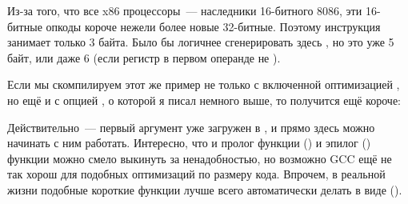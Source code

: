 Из-за того, что все x86 процессоры~--- наследники 16-битного 8086, эти  16-битные опкоды короче 
нежели более новые 32-битные. 
Поэтому инструкция  занимает только 3 байта. 
Было бы логичнее сгенерировать здесь , но это уже 5 байт, или даже 6 
(если регистр в первом операнде не \EAX).


Если мы скомпилируем этот же пример не только с включенной оптимизацией \Othree, 
но ещё и с опцией , о которой я писал немного выше, то получится ещё короче:



Действительно~--- первый аргумент уже загружен в \EAX, и прямо здесь можно начинать с ним работать. 
Интересно, что и пролог функции () и эпилог () 
функции можно смело выкинуть за ненадобностью, 
но возможно GCC ещё не так хорош для подобных оптимизаций по размеру кода. 
Впрочем, в реальной жизни подобные короткие функции лучше всего автоматически делать в виде 
 ().


